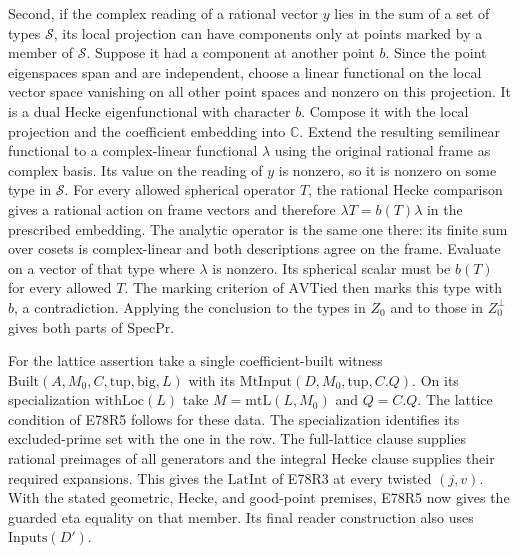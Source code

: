 Second, if the complex reading of a rational vector $y$ lies in the
sum of a set of types $\mathcal S$, its local projection can have
components only at points marked by a member of $\mathcal S$.
Suppose it had a component at another point $b$. Since the point
eigenspaces span and are independent, choose a linear functional
on the local vector space vanishing on all other point spaces and
nonzero on this projection. It is a dual Hecke eigenfunctional
with character $b$. Compose it with the local projection and the
coefficient embedding into $\mathbb C$. Extend the resulting
semilinear functional to a complex-linear functional $\lambda$
using the original rational frame as complex basis. Its value on
the reading of $y$ is nonzero, so it is nonzero on some type in
$\mathcal S$. For every allowed spherical operator $T$, the rational
Hecke comparison gives a rational action on frame vectors and
therefore $\lambda T=b(T)\lambda$ in the prescribed embedding.
The analytic operator is the same one there: its finite sum over
cosets is complex-linear and both descriptions agree on the frame.
Evaluate on a vector of that type where $\lambda$ is nonzero. Its
spherical scalar must be $b(T)$ for every allowed $T$. The marking
criterion of $\mathrm{AVTied}$ then marks this type with $b$, a
contradiction. Applying the conclusion to the types in $Z_0$ and
to those in $Z_0^\perp$ gives both parts of $\mathrm{SpecPr}$.

For the lattice assertion take a single coefficient-built witness
$\mathrm{Built}(A,M_0,C,\mathrm{tup},\mathrm{big},L)$ with its
$\mathrm{MtInput}(D,M_0,\mathrm{tup},C.Q)$. On its specialization
$\mathrm{withLoc}(L)$ take $M=\mathrm{mtL}(L,M_0)$ and $Q=C.Q$.
The lattice condition of E78R5 follows for these data. The
specialization identifies its excluded-prime set with the one in
the row. The full-lattice clause supplies rational preimages of all
generators and the integral Hecke clause supplies their required
expansions. This gives the $\mathrm{LatInt}$ of E78R3 at every
twisted $(j,v)$. With the stated geometric, Hecke, and good-point
premises, E78R5 now gives the guarded eta equality on that member.
Its final reader construction also uses $\mathrm{Inputs}(D')$.
